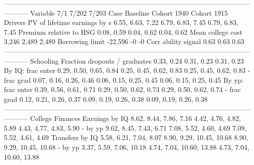 -----------------------------------------------------------------------------------------------------------------------
                              Variable                          7/1                     7/202                     7/203
                                  Case                     Baseline               Cohort 1940               Cohort 1915
                               Drivers                                                                                 
          PV of lifetime earnings by s             6.55, 6.63, 7.22          6.79, 6.83, 7.45          6.79, 6.83, 7.45
               Premium relative to HSG                   0.08, 0.59                0.04, 0.62                0.04, 0.62
                     Mean college cost                        3,246                     2,489                     2,489
                       Borrowing limit                      -22,596                        -0                        -0
                   Corr ability signal                         0.63                      0.63                      0.63
-----------------------------------------------------------------------------------------------------------------------
                             Schooling                                                                                 
         Fraction dropouts / graduates                   0.33, 0.24                0.31, 0.23                0.31, 0.23
                     By IQ: frac enter       0.29, 0.50, 0.65, 0.84    0.25, 0.45, 0.62, 0.83    0.25, 0.45, 0.62, 0.83
                           - frac grad       0.07, 0.16, 0.26, 0.46    0.06, 0.15, 0.25, 0.45    0.06, 0.15, 0.25, 0.45
                     By yp: frac enter       0.39, 0.56, 0.61, 0.71    0.29, 0.50, 0.62, 0.73    0.29, 0.50, 0.62, 0.74
                           - frac grad       0.12, 0.21, 0.26, 0.37    0.09, 0.19, 0.26, 0.38    0.09, 0.19, 0.26, 0.38
-----------------------------------------------------------------------------------------------------------------------
                      College Finances                                                                                 
                        Earnings by IQ       8.62, 8.44, 7.86, 7.16    4.42, 4.76, 4.82, 5.89    4.43, 4.77, 4.83, 5.90
                               - by yp       9.62, 8.45, 7.43, 6.71    7.08, 5.52, 4.60, 4.69    7.09, 5.52, 4.61, 4.69
                       Transfers by IQ       5.58, 6.21, 7.04, 8.07  8.90, 9.29, 10.45, 10.68  8.90, 9.29, 10.45, 10.68
                               - by yp      3.37, 5.59, 7.06, 10.18  4.74, 7.04, 10.60, 13.88  4.73, 7.04, 10.60, 13.88

